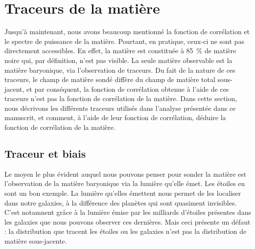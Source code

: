 \section{Traceurs de la matière}
Jusqu'à maintenant, nous avons beaucoup mentionné la fonction de corrélation et le spectre de puissance de la matière.
Pourtant, en pratique, ceux-ci ne sont pas directement accessibles.
En effet, la matière est constituée à \SI{85}{\percent} de matière noire qui, par définition, n'est pas visible. La seule matière observable est la matière baryonique, via l'observation de traceurs. Du fait de la nature de ces traceurs, le champ de matière sondé diffère du champ de matière total sous-jacent, et par conséquent, la fonction de corrélation obtenue à l'aide de ces traceurs n'est pas la fonction de corrélation de la matière. Dans cette section, nous décrivons les différents traceurs utilisés dans l'analyse présentée dans ce manuscrit, et comment, à l'aide de leur fonction de corrélation, déduire la fonction de corrélation de la matière.


\subsection{Traceur et biais}
Le moyen le plus évident auquel nous pouvons penser pour sonder la matière est l'observation de la matière baryonique via la lumière qu'elle émet. Les étoiles en sont un bon exemple. La lumière qu'elles émettent nous permet de les localiser dans notre galaxies, à la différence des planètes qui sont quasiment invisibles. C'est notamnent grâce à la lumière émise par les milliards d'étoiles présentes dans les galaxies que nous pouvons observer ces dernières. Mais ceci présente un défaut : la distribution que tracent les étoiles ou les galaxies n'est pas la distribution de matière sous-jacente.

